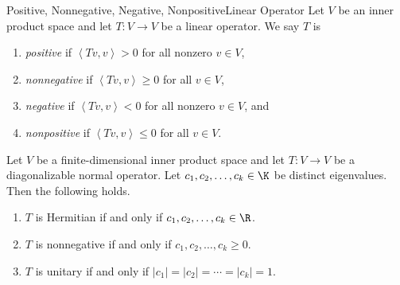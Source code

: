 \documentclass[linearalgebra]{subfiles}
\begin{document}
    \begin{definition}{Positive, Nonnegative, Negative, Nonpositive}{Linear Operator}
        Let $V$ be an inner product space and let $T:V\to V$ be a linear operator. We say $T$ is
        \begin{enumerate}
            \item \emph{positive} if $\left\langle Tv, v\right\rangle > 0$ for all nonzero $v\in V$,
            \item \emph{nonnegative} if $\left\langle Tv, v\right\rangle \geq 0$ for all $v\in V$,
            \item \emph{negative} if $\left\langle Tv, v\right\rangle < 0$ for all nonzero $v\in V$, and
            \item \emph{nonpositive} if $\left\langle Tv, v\right\rangle \leq 0$ for all $v\in V$.
        \end{enumerate}
    \end{definition}

    \begin{prop}{}
        Let $V$ be a finite-dimensional inner product space and let $T:V\to V$ be a diagonalizable normal operator. Let $c_1,c_2,\ldots,c_k\in\K$ be distinct eigenvalues. Then the following holds.
        \begin{enumerate}
            \item $T$ is Hermitian if and only if $c_1,c_2,\ldots,c_k\in\R$.
            \item $T$ is nonnegative if and only if $c_1,c_2,\ldots,c_k\geq 0$.
            \item $T$ is unitary if and only if $\left| c_1 \right| = \left| c_2 \right| =\cdots= \left| c_k \right| = 1$.
        \end{enumerate}
    \end{prop}
\end{document}
